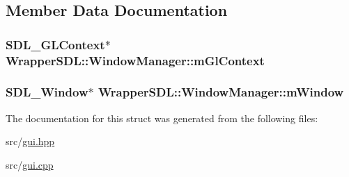 \subsection{Member Data Documentation}
\subsubsection[{\texorpdfstring{m\+Gl\+Context}{mGlContext}}]{\setlength{\rightskip}{0pt plus 5cm}S\+D\+L\+\_\+\+G\+L\+Context$\ast$ Wrapper\+S\+D\+L\+::\+Window\+Manager\+::m\+Gl\+Context}\hypertarget{struct_wrapper_s_d_l_1_1_window_manager_a8257cbe95c6577a81fcfa83519f5e036}{}\label{struct_wrapper_s_d_l_1_1_window_manager_a8257cbe95c6577a81fcfa83519f5e036}
\subsubsection[{\texorpdfstring{m\+Window}{mWindow}}]{\setlength{\rightskip}{0pt plus 5cm}S\+D\+L\+\_\+\+Window$\ast$ Wrapper\+S\+D\+L\+::\+Window\+Manager\+::m\+Window}\hypertarget{struct_wrapper_s_d_l_1_1_window_manager_a38d24f995d5ed81c582edc825aeaf3c2}{}\label{struct_wrapper_s_d_l_1_1_window_manager_a38d24f995d5ed81c582edc825aeaf3c2}


The documentation for this struct was generated from the following files\+:\begin{DoxyCompactItemize}
\item 
src/\hyperlink{gui_8hpp}{gui.\+hpp}\item 
src/\hyperlink{gui_8cpp}{gui.\+cpp}\end{DoxyCompactItemize}
